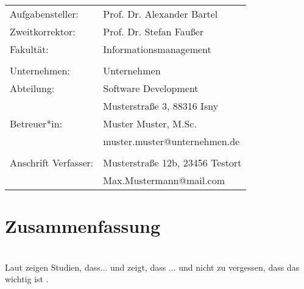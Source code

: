 \documentclass[12pt, a4paper, twoside]{article} %
\makeatletter
\newcommand*{\getFaculty}{Informationsmanagement}
\newcommand*{\getAuthorAddress}{Musterstraße 12b, 23456 Testort}
\newcommand*{\getAuthorEmail}{Max.Mustermann@mail.com}
\newcommand*{\getSupervisor}{Prof. Dr. Alexander Bartel}
\newcommand*{\getCoSupervisor}{Prof. Dr. Stefan Faußer}
\newcommand*{\getAdvisor}{Muster Muster, M.Sc.}
\newcommand*{\getCompany}{Unternehmen}
\newcommand*{\getCompanyDepartment}{Software Development}
\newcommand*{\getCompanyAddress}{Musterstraße 3, 88316 Isny}
\makeatother
\begin{document}
\begin{titlepage}
\begin{center}
\begin{minipage}{\textwidth}
            \begin{minipage}{0.4\textwidth}
                \raggedleft
                \small
                \begin{tabular}{l l}
                    Aufgabensteller: & \getSupervisor \\
                    Zweitkorrektor: & \getCoSupervisor \\
                    Fakultät: & \getFaculty \\
    			&\\
                    Unternehmen: & \getCompany \\
                    Abteilung: & \getCompanyDepartment \\
                    &\getCompanyAddress \\
                    Betreuer*in: & \getAdvisor \\
                    &muster.muster@unternehmen.de \\
        		&\\
                    Anschrift Verfasser: & \getAuthorAddress \\
                    &\getAuthorEmail \\
                \end{tabular}
            \end{minipage}
        \end{minipage}


        \vspace*{\fill} %
    \end{center}
\end{titlepage}


\restoregeometry %

\section*{Zusammenfassung}
\lipsum[1-2] %
\\
Laut \cite{example} zeigen Studien, dass... und \cite{lin1973} zeigt, dass ... und nicht zu vergessen, dass das wichtig ist \cite[vgl.][S. 15ff.]{Jain}.
\end{document}
